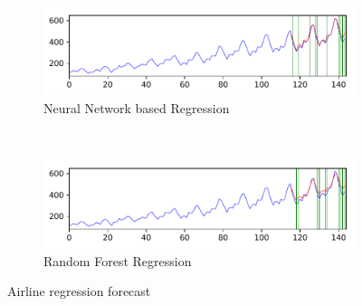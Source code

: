 \documentclass{article} %
\begin{document}
\begin{figure}
	\centering
	\captionsetup{labelformat=empty}
	\begin{subfigure}[b]{1.0\textwidth}
		\includegraphics[width=\textwidth, clip=true, trim=0mm 0mm 0mm 0mm]{timeseries_regression_airline_12_nnsk}
		\caption{Neural Network based Regression}
		\label{fig:nnsk}
	\end{subfigure} \\
	\begin{subfigure}[b]{1.0\textwidth}
		\includegraphics[width=\textwidth, clip=true, trim=0mm 0mm 0mm 0mm]{timeseries_regression_airline_12_rfor}
		\caption{Random Forest Regression}
		\label{fig:rfor}
	\end{subfigure}
	\caption{Airline regression forecast}
	\label{fig:regression}
\end{figure}
\end{document}
